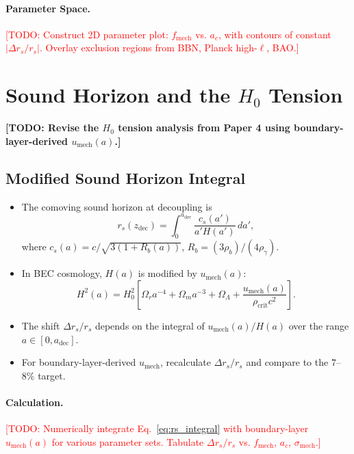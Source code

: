 \documentclass[11pt,a4paper]{article}
\newcommand{\rhocrit}{\ensuremath{\rho_{\mathrm{crit}}}}
\newcommand{\umech}{\ensuremath{u_{\mathrm{mech}}}}
\newcommand{\fmech}{\ensuremath{f_{\mathrm{mech}}}}
\newcommand{\ac}{\ensuremath{a_c}}
\newcommand{\sigmamech}{\ensuremath{\sigma_{\mathrm{mech}}}}
\newcommand{\adec}{\ensuremath{a_{\mathrm{dec}}}}
\newcommand{\zdec}{\ensuremath{z_{\mathrm{dec}}}}
\newcommand{\rs}{\ensuremath{r_s}}
\newcommand{\Omm}{\ensuremath{\Omega_m}}
\newcommand{\Omr}{\ensuremath{\Omega_r}}
\newcommand{\OmL}{\ensuremath{\Omega_\Lambda}}
\theoremstyle{definition}
\theoremstyle{remark}
\begin{document}
\paragraph{Parameter Space.}
\textcolor{red}{[TODO: Construct 2D parameter plot: $\fmech$ vs. $\ac$, with contours of constant $|\Delta\rs/\rs|$. Overlay exclusion regions from BBN, Planck high-$\ell$, BAO.]}

\section{Sound Horizon and the $H_0$ Tension}
\label{sec:h0_tension}

\textbf{[TODO: Revise the $H_0$ tension analysis from Paper 4 using boundary-layer-derived $\umech(a)$.]}

\subsection{Modified Sound Horizon Integral}
\label{sec:sound_horizon}

\begin{itemize}[leftmargin=*, itemsep=0.3em]
\item The comoving sound horizon at decoupling is
\begin{equation}
\rs(\zdec) = \int_0^{\adec} \frac{c_s(a')}{a' H(a')} \, da',
\label{eq:rs_integral}
\end{equation}
where $c_s(a) = c/\sqrt{3(1 + R_b(a))}$, $R_b = (3\rho_b)/(4\rho_\gamma)$.
\item In BEC cosmology, $H(a)$ is modified by $\umech(a)$:
\begin{equation}
H^2(a) = H_0^2 \left[ \Omr a^{-4} + \Omm a^{-3} + \OmL + \frac{\umech(a)}{\rhocrit c^2} \right].
\label{eq:H_modified}
\end{equation}
\item The shift $\Delta\rs/\rs$ depends on the integral of $\umech(a)/H(a)$ over the range $a \in [0, \adec]$.
\item For boundary-layer-derived $\umech$, recalculate $\Delta\rs/\rs$ and compare to the $7$--$8\%$ target.
\end{itemize}

\paragraph{Calculation.}
\textcolor{red}{[TODO: Numerically integrate Eq.~\ref{eq:rs_integral} with boundary-layer $\umech(a)$ for various parameter sets. Tabulate $\Delta\rs/\rs$ vs. $\fmech$, $\ac$, $\sigmamech$.]}
\end{document}
